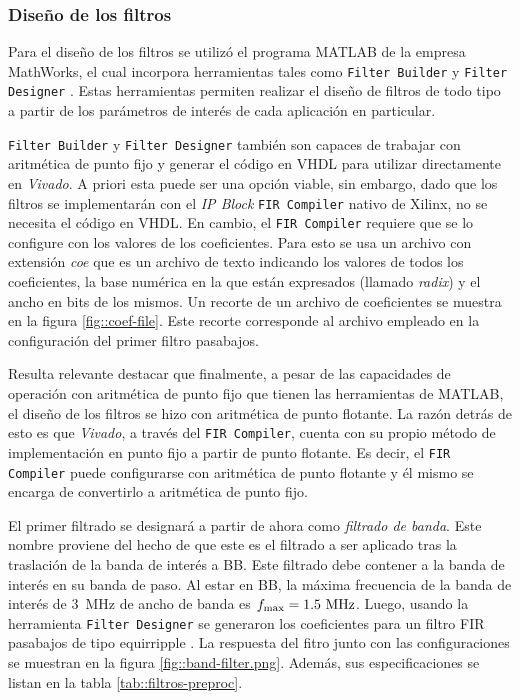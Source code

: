 \documentclass[../../main.tex]{subfiles}
\begin{document}
\subsubsection{Diseño de los filtros}
Para el diseño de los filtros se utilizó el programa MATLAB de la empresa MathWorks, el cual incorpora herramientas tales como \texttt{Filter Builder} \cite{filter-builder} y \texttt{Filter Designer} \cite{filter-designer}. Estas herramientas permiten realizar el diseño de filtros de todo tipo a partir de los parámetros de interés de cada aplicación en particular. 

\texttt{Filter Builder} y \texttt{Filter Designer} también son capaces de trabajar con aritmética de punto fijo y generar el código en VHDL para utilizar directamente en \textit{Vivado}. A priori esta puede ser una opción viable, sin embargo, dado que los filtros se implementarán con el \textit{IP Block} \texttt{FIR Compiler} nativo de Xilinx, no se necesita el código en VHDL. En cambio, el \texttt{FIR Compiler} requiere que se lo configure con los valores de los coeficientes. Para esto se usa un archivo con extensión \textit{coe} que es un archivo de texto indicando los valores de todos los coeficientes, la base numérica en la que están expresados (llamado \textit{radix}) y el ancho en bits de los mismos. Un recorte de un archivo de coeficientes se muestra en la figura \ref{fig::coef-file}. Este recorte corresponde al archivo empleado en la configuración del primer filtro pasabajos.

Resulta relevante destacar que finalmente, a pesar de las capacidades de operación con aritmética de punto fijo que tienen las herramientas de MATLAB, el diseño de los filtros se hizo con aritmética de punto flotante. La razón detrás de esto es que \textit{Vivado}, a través del \texttt{FIR Compiler}, cuenta con su propio método de implementación en punto fijo a partir de punto flotante. Es decir, el \texttt{FIR Compiler} puede configurarse con aritmética de punto flotante y él mismo se encarga de convertirlo a aritmética de punto fijo.



El primer filtrado se designará a partir de ahora como \textit{filtrado de banda}. Este nombre proviene del hecho de que este es el filtrado a ser aplicado tras la traslación de la banda de interés a BB. Este filtrado debe contener a la banda de interés en su banda de paso. Al estar en BB, la máxima frecuencia de la banda de interés de 3~MHz de ancho de banda es $f_\textrm{max} = 1.5~\textrm{MHz}$. Luego, usando la herramienta \texttt{Filter Designer} se generaron los coeficientes para un filtro FIR pasabajos de tipo equirripple . La respuesta del fitro junto con las configuraciones se muestran en la figura \ref{fig::band-filter.png}. Además, sus especificaciones se listan en la tabla \ref{tab::filtros-preproc}.
\end{document}
